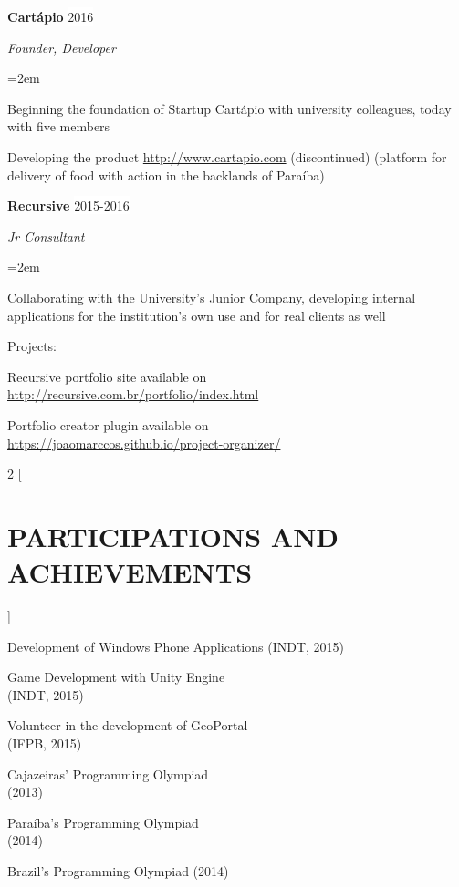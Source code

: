 \documentclass[paper=a4,fontsize=14pt]{article}
\let\olditemize\itemize
\let\endolditemize\enditemize
\renewenvironment{itemize}{%
    \small
    \olditemize
}{%
    \endolditemize
}
\newcommand{\NewPart}[1]{ \section*{\large \uppercase{#1}}}
\newcommand{\EducationEntry}[4]{
		\noindent \textbf{#1} \hfill 			%
		\colorbox{White}{%
			\parbox{6em}{%
			\hfill\color{Black}#2}} \par		%
		\noindent \textit{#3} \par			%
		\noindent\hangindent=2em\hangafter=0 \small #4 	%
		\normalsize \par}
\newcommand{\WorkEntry}[4]{						%
		\noindent \textbf{#1} \hfill 				%
		\colorbox{White}{\color{Black}#2} \par			%
		\noindent \textit{#3} \par				%
		\noindent\hangindent=2em\hangafter=0 \small #4 		%
		\normalsize \par \vspace*{.5em}}
\begin{document}
\newpage

\WorkEntry{Cartápio}{2016}{Founder, Developer}{
\begin{itemize}
    \item Beginning the foundation of Startup Cartápio with university colleagues, today with five members
    \item Developing the product \url{http://www.cartapio.com} (discontinued) (platform for delivery of food with action in the backlands of Paraíba)
\end{itemize}
}

\WorkEntry{Recursive}{2015-2016}{Jr Consultant}{
\begin{itemize}
    \item Collaborating with the University's Junior Company, developing internal applications for the institution's own use and for real clients as well
    \item Projects:
    \begin{itemize}
        \item Recursive portfolio site available on \\ \url{http://recursive.com.br/portfolio/index.html}
        \item Portfolio creator plugin available on \\ \url{https://joaomarccos.github.io/project-organizer/}
    \end{itemize}
\end{itemize}
}

\begin{multicols}{2}
[
\NewPart{Participations and Achievements}{}
]
\begin{itemize}
    \item Development of Windows Phone Applications (INDT, 2015)
    \item Game Development with Unity Engine \\(INDT, 2015)     
    \item Volunteer in the development of GeoPortal \\(IFPB, 2015)
\end{itemize}
\columnbreak
\begin{itemize}
    \item Cajazeiras' Programming Olympiad \\(2013)
    \item Paraíba's Programming Olympiad \\(2014)
    \item Brazil's Programming Olympiad  (2014)
\end{itemize}
\end{multicols}
\end{document}
